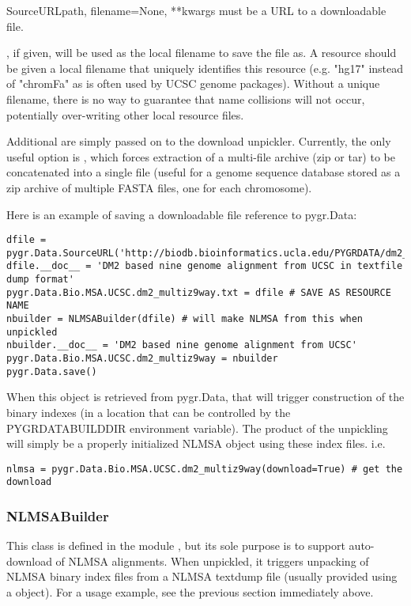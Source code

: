 \documentclass{howto}
\begin{document}
\begin{funcdesc}{SourceURL}{path, filename=None, **kwargs}
   must be a URL to a downloadable file.

  , if given, will be used as the local filename
  to save the file as.  A resource should be given a local
  filename that uniquely identifies this resource (e.g. "hg17"
  instead of "chromFa" as is often used by UCSC genome packages).
  Without a unique filename, there is no way to guarantee that
  name collisions will not occur, potentially over-writing other
  local resource files.

  Additional  are simply passed on to the download
  unpickler.  Currently, the only useful option is ,
  which forces extraction of a multi-file archive (zip or tar) to
  be concatenated into a single file (useful for a genome sequence
  database stored as a zip archive of multiple FASTA files, one for
  each chromosome).
\end{funcdesc}

Here is an example of saving a downloadable file reference to
pygr.Data:
\begin{verbatim}
dfile = pygr.Data.SourceURL('http://biodb.bioinformatics.ucla.edu/PYGRDATA/dm2_multiz9way.txt.gz')
dfile.__doc__ = 'DM2 based nine genome alignment from UCSC in textfile dump format'
pygr.Data.Bio.MSA.UCSC.dm2_multiz9way.txt = dfile # SAVE AS RESOURCE NAME
nbuilder = NLMSABuilder(dfile) # will make NLMSA from this when unpickled
nbuilder.__doc__ = 'DM2 based nine genome alignment from UCSC'
pygr.Data.Bio.MSA.UCSC.dm2_multiz9way = nbuilder
pygr.Data.save() 
\end{verbatim}

When this object is retrieved from pygr.Data, that will trigger  
construction of the binary indexes (in a location that can be  
controlled by the PYGRDATABUILDDIR environment variable).  The product  
of the unpickling will simply be a properly initialized NLMSA object  
using these index files. i.e.
\begin{verbatim}
nlmsa = pygr.Data.Bio.MSA.UCSC.dm2_multiz9way(download=True) # get the download
\end{verbatim}

\subsubsection{NLMSABuilder}
This class is defined in the module , but its
sole purpose is to support auto-download of NLMSA alignments.
When unpickled, it triggers unpacking of NLMSA binary index files
from a NLMSA textdump file (usually provided using a 
object).  For a usage example, see the previous section immediately
above.
 
\end{document}
